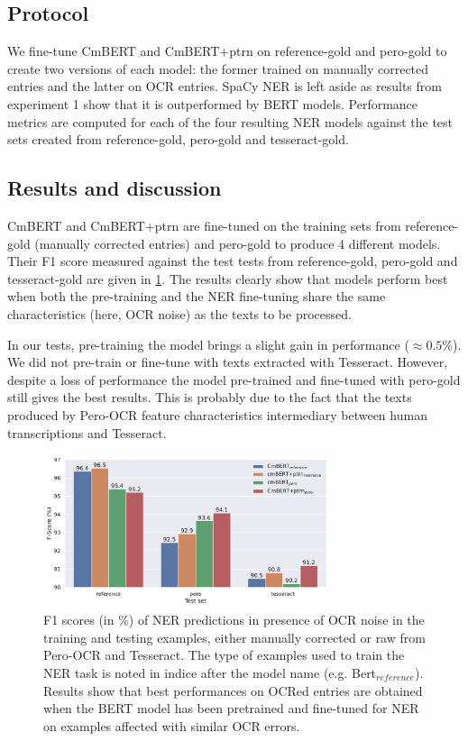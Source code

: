 \subsection{Protocol}

We fine-tune CmBERT and CmBERT+ptrn on reference-gold and pero-gold to create two versions of each model: the former trained on manually corrected entries and the latter on OCR entries.
SpaCy NER is left aside as results from experiment 1 show that it is outperformed by BERT models.
Performance metrics are computed for each of the four resulting NER models against the test sets created from reference-gold, pero-gold and tesseract-gold.


\subsection{Results and discussion}


CmBERT and CmBERT+ptrn are fine-tuned on the training sets from reference-gold (manually corrected entries) and pero-gold to produce 4 different models.
Their F1 score measured against the test tests from reference-gold, pero-gold and tesseract-gold are given in \cref{fig:exp_2_eval_ner}.
The results clearly show that models perform best when both the pre-training and the NER fine-tuning share the same characteristics (here, OCR noise) as the texts to be processed.

In our tests, pre-training the model brings a slight gain in performance ($\approx 0.5\%$).
We did not pre-train or fine-tune with texts extracted with Tesseract.
However, despite a loss of performance the model pre-trained and fine-tuned with pero-gold still gives the best results.
This is probably due to the fact that the texts produced by Pero-OCR feature characteristics intermediary between human transcriptions and Tesseract.

\begin{figure}
    \centering
    \includegraphics[width=0.75\textwidth]{images/experiment_2_f1_with_noise_graph.pdf}
    \caption{F1 scores (in \%) of NER predictions in presence of OCR noise in the training and testing examples, either manually corrected or raw from Pero-OCR and Tesseract. The type of examples used to train the NER task is noted in indice after the model name (e.g. Bert$_{reference}$). Results show that best performances on OCRed entries are obtained when the BERT model has been pretrained and fine-tuned for NER on examples affected with similar OCR errors.}
    \label{fig:exp_2_eval_ner}
\end{figure}

